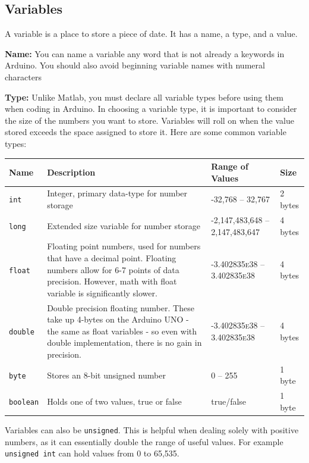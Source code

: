 \subsection*{Variables}
A variable is a place to store a piece of date. It has a name, a type, and a value.
\par \textbf{Name:} You can name a variable any word that is not already a keywords in Arduino. You should also avoid beginning variable names with numeral characters

\par \textbf{Type:} Unlike Matlab, you must declare all variable types before using them when coding in Arduino. In choosing a variable type, it is important to consider the size of the numbers you want to store. Variables will roll on when the value stored exceeds the space assigned to store it. Here are some common variable types:

\begin{center}
\begin{tabular}{l p{7.5cm} l l}
\textbf{Name} & \textbf{Description} & \textbf{Range of Values} & \textbf{Size} \\ \hline
\texttt{int} & Integer, primary data-type for number storage & -32,768 \mbox{--} 32,767 & 2 bytes \\ \hline
\texttt{long} & Extended size variable for number storage & -2,147,483,648 \mbox{--} 2,147,483,647 & 4 bytes \\ \hline
\texttt{float} & Floating point numbers, used for numbers that have a decimal point. Floating numbers allow for 6-7 points of data precision.  However, math with float variable is significantly slower. & -3.402835\mbox{\textsc{e}}38 \mbox{--} 3.402835\mbox{\textsc{e}}38 & 4 bytes \\ \hline
\texttt{double} & Double precision floating number. These take up 4-bytes on the Arduino UNO - the same as float variables - so even with double implementation, there is no gain in precision. & -3.402835\mbox{\textsc{e}}38 \mbox{--} 3.402835\mbox{\textsc{e}}38 & 4 bytes \\ \hline
\texttt{byte} & Stores an 8-bit unsigned number & 0 \mbox{--} 255 & 1 byte \\ \hline
\texttt{boolean} & Holds one of two values, true or false & true/false & 1 byte \\ \hline
\end{tabular}
\end{center}

Variables can also be \texttt{unsigned}.  This is helpful when dealing solely with positive numbers, as it can essentially double the range of useful values.  For example \texttt{unsigned int} can hold values from 0 to 65,535. 

